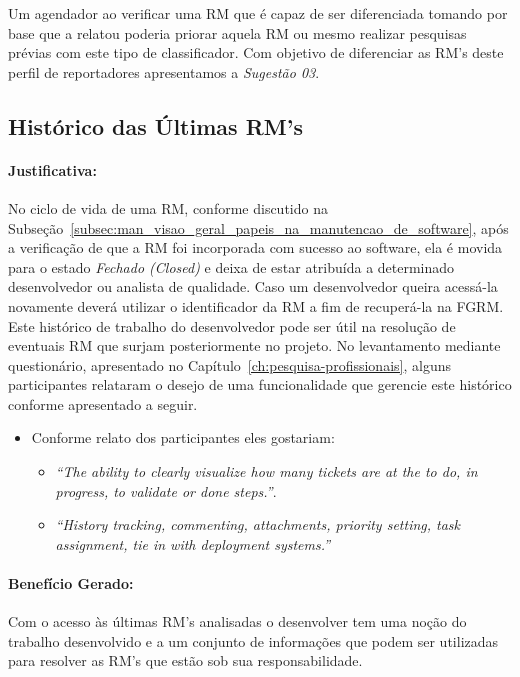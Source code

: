 Um agendador ao verificar uma RM que é capaz de ser diferenciada tomando por
base que a relatou poderia priorar aquela RM ou mesmo realizar pesquisas prévias
com este tipo de classificador. Com objetivo de diferenciar as RM's deste perfil
de reportadores apresentamos a \textit{Sugestão 03}.


\subsection{Histórico das Últimas RM's}
\label{sub:histórico_das_ùltimas_rm_s}

\paragraph{Justificativa:}
\label{par:justificativa_s04}

No ciclo de vida de uma RM, conforme discutido na
Subseção~\ref{subsec:man_visao_geral_papeis_na_manutencao_de_software}, após a
verificação de que a RM foi incorporada com sucesso ao software, ela é movida
para o estado \textit{Fechado (Closed)} e deixa de estar atribuída a determinado
desenvolvedor ou analista de qualidade. Caso um desenvolvedor queira acessá-la
novamente deverá utilizar o identificador da RM a fim de recuperá-la na FGRM\@.
Este histórico de trabalho do desenvolvedor pode ser útil na resolução de
eventuais RM que surjam posteriormente no projeto. No levantamento mediante
questionário, apresentado no Capítulo~\ref{ch:pesquisa-profissionais}, alguns
participantes relataram o desejo de uma funcionalidade  que gerencie este
histórico conforme apresentado a seguir.

\begin{itemize}
	\item Conforme relato dos participantes eles gostariam:
	\begin{itemize}
		\item \textit{``The ability to clearly visualize how many tickets are at
				the to do, in progress, to validate or done steps.''}.
		\item \textit{``History tracking, commenting, attachments, priority
				setting, task assignment, tie in with deployment systems.''}
	\end{itemize}
\end{itemize}

\paragraph{Benefício Gerado:}
\label{par:papéis_afetados_s04}
Com o acesso às últimas RM's analisadas o desenvolver tem uma noção do trabalho
desenvolvido e a um conjunto de informações que podem ser utilizadas para
resolver as RM's que estão sob sua responsabilidade.


